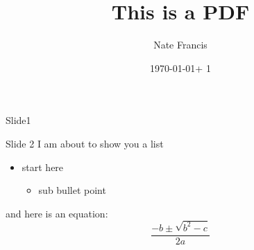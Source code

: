 \documentclass[10pt]{beamer}
\title{This is a PDF}
\author{Nate Francis}
\date{\today + 1}
\begin{document}
\begin{frame}{Slide1}
    \titlepage
\end{frame}
\begin{frame}{Slide 2}
    I am about to show you a list
    \begin{itemize}
        \item start here
        \begin{itemize}
            \item sub bullet point
        \end{itemize}
    \end{itemize}
    and here is an equation:
	\[\frac{-b \pm \sqrt{b^2 - c}}{2a}\]
\end{frame}
\end{document}
